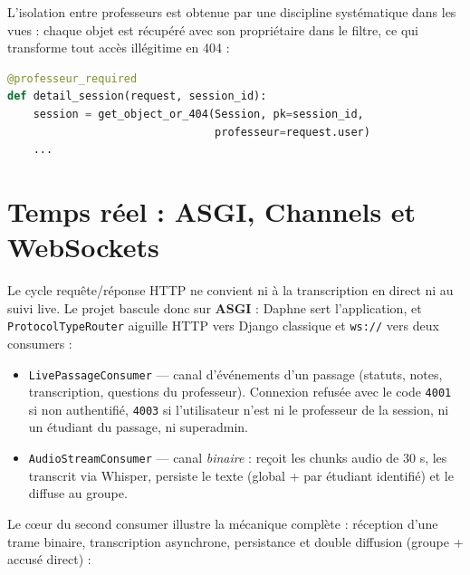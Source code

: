 \documentclass[12pt,a4paper]{report}
\begin{document}
L'isolation entre professeurs est obtenue par une discipline systématique dans
les vues : chaque objet est récupéré avec son propriétaire dans le filtre,
ce qui transforme tout accès illégitime en 404 :

\begin{lstlisting}[language=Python, caption={Contrôle d'accès type (extrait de \texttt{sessions\_app/views.py})}]
@professeur_required
def detail_session(request, session_id):
    session = get_object_or_404(Session, pk=session_id,
                                professeur=request.user)
    ...
\end{lstlisting}

\section{Temps réel : ASGI, Channels et WebSockets}

Le cycle requête/réponse HTTP ne convient ni à la transcription en direct ni au
suivi live. Le projet bascule donc sur \textbf{ASGI} : Daphne sert
l'application, et \texttt{ProtocolTypeRouter} aiguille HTTP vers Django
classique et \texttt{ws://} vers deux consumers :

\begin{itemize}
  \item \texttt{LivePassageConsumer} --- canal d'événements d'un passage
        (statuts, notes, transcription, questions du professeur). Connexion
        refusée avec le code \texttt{4001} si non authentifié, \texttt{4003}
        si l'utilisateur n'est ni le professeur de la session, ni un étudiant
        du passage, ni superadmin.
  \item \texttt{AudioStreamConsumer} --- canal \emph{binaire} : reçoit les
        chunks audio de 30 s, les transcrit via Whisper, persiste le texte
        (global + par étudiant identifié) et le diffuse au groupe.
\end{itemize}

Le cœur du second consumer illustre la mécanique complète : réception d'une
trame binaire, transcription asynchrone, persistance et double diffusion
(groupe + accusé direct) :
\end{document}
